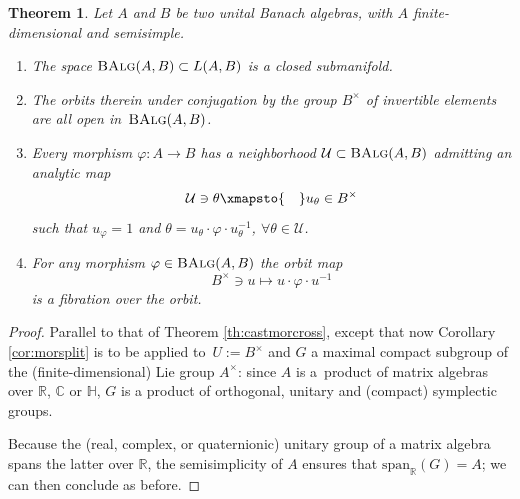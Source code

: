 \documentclass[pdftex]{sigma}
\numberwithin{equation}{section}
\newtheorem{Theorem}{Theorem}[section]
\newcommand\bC{{\mathbb C}}
\newcommand\bH{{\mathbb H}}
\newcommand\bR{{\mathbb R}}
\newcommand\cU{{\mathcal U}}
\newcommand{\cat}[1]{\text{\sc #1}}
\begin{document}
\begin{Theorem}\label{th:banmorcross}
 Let $A$ and $B$ be two unital Banach algebras, with $A$ finite-dimensional and semisimple.
 \begin{enumerate}[$(1)$]\itemsep=0pt
 \item\label{item:banisman} The space $\cat{BAlg}(A,B)\subset L(A,B)$ is a closed submanifold.

 \item\label{item:banopenorb} The orbits therein under conjugation by the group $B^{\times}$ of invertible elements are all open in~$\cat{BAlg}(A,B)$.

 \item\label{item:bansect} Every morphism $\varphi\colon A\to B$ has a neighborhood $\cU\subset \cat{BAlg}(A,B)$ admitting an analytic map
 \begin{equation*}
 \cU\ni \theta\xmapsto{\quad}u_{\theta}\in B^{\times}
 \end{equation*}
 such that $u_{\varphi}=1$ and $\theta = u_{\theta}\cdot \varphi\cdot u_{\theta}^{-1}$, $\forall \theta\in \cU$.

 \item\label{item:banfib} For any morphism $\varphi\in \cat{BAlg}(A,B)$ the orbit map
 \begin{equation*}
 B^{\times}\ni u\mapsto u\cdot \varphi\cdot u^{-1}
 \end{equation*}
 is a fibration over the orbit.



 \end{enumerate}
\end{Theorem}
\begin{proof}
 Parallel to that of Theorem \ref{th:castmorcross}, except that now Corollary \ref{cor:morsplit} is to be applied to~${U\!:=\!B^{\times}}$ and $G$ a maximal compact subgroup of the (finite-dimensional) Lie group $A^{\times}$: since $A$ is a~product of matrix algebras over $\bR$, $\bC$ or $\bH$, $G$ is a product of orthogonal, unitary and (compact) symplectic \cite[Exercise 7.4 and discussion preceding it]{fh} groups.

 Because the (real, complex, or quaternionic) unitary group of a matrix algebra spans the latter over $\bR$, the semisimplicity of $A$ ensures that $\mathrm{span}_{\bR}(G)=A$;
 we can then conclude as before.
\end{proof}
\end{document}
